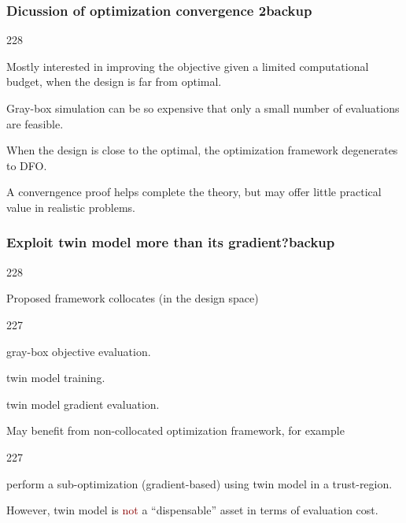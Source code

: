 \documentclass{beamer}
\newcommand{\barrow}{\item[\color{darkred}\ding{228}]}
\newcommand{\carrow}{\item[\color{darkred}\ding{227}]}
\begin{document}
\begin{frame}
    \frametitle{Dicussion of optimization convergence 2\hfill \scriptsize{backup}}\small
    \begin{dinglist}{228}
        \barrow Mostly interested in improving the objective given a limited computational budget, when 
                the design is far from optimal.\vspace{.15cm}
        \barrow Gray-box simulation can be so expensive that only a small number of evaluations are feasible.\vspace{.15cm}
        \barrow When the design is close to the optimal, the optimization framework degenerates to DFO.\vspace{.15cm}
        \barrow A converngence proof helps complete the theory, but may offer little practical value in realistic problems.
    \end{dinglist}
\end{frame}

\begin{frame}
    \frametitle{Exploit twin model more than its gradient?\hfill \scriptsize{backup}}\small
    \begin{dinglist}{228}
        \barrow Proposed framework collocates (in the design space)
        \begin{dinglist}{227}
            \carrow gray-box objective evaluation.\vspace{.1cm}
            \carrow twin model training.\vspace{.1cm}
            \carrow twin model gradient evaluation.
        \end{dinglist}\vspace{.2cm}
        \barrow May benefit from non-collocated optimization framework, for example
        \begin{dinglist}{227}
            \carrow perform a sub-optimization (gradient-based) using twin model in a trust-region.
        \end{dinglist}\vspace{.2cm}
        \barrow However, 
            twin model is \textcolor{darkred}{not} a ``dispensable'' asset in terms of evaluation cost.
    \end{dinglist}
\end{frame}
\end{document}
